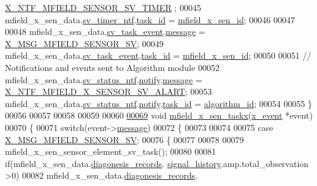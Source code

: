 \begin{DoxyCode}
      \hyperlink{a00025_ad9eede821e7c65d58f1806af4bd6bf29}{X\_NTF\_MFIELD\_SENSOR\_SV\_TIMER} ;
00045     mfield\_x\_sen\_data.\hyperlink{a00025_ada91b200053f2d93e3639dc4ee3415b4}{sv\_timer\_ntf}.\hyperlink{a00036_a21b41e494a28583d4da10f1afb1c5328}{task\_id}                        = 
      \hyperlink{a00052_a19a33e680bf19d1aed76750132ed8b64}{mfield\_x\_sen\_id};
00046 
00047 
00048     mfield\_x\_sen\_data.\hyperlink{a00025_a43c345f39ea3aefbb60ef1ef57fe5d83}{sv\_task\_event}.\hyperlink{a00036_adf9665938515a20c283eea2c978cf80d}{message}                  = 
      \hyperlink{a00025_a510020575747f82c587c5485b8619f78}{X\_MSG\_MFIELD\_SENSOR\_SV};
00049     mfield\_x\_sen\_data.\hyperlink{a00025_a43c345f39ea3aefbb60ef1ef57fe5d83}{sv\_task\_event}.\hyperlink{a00036_a21b41e494a28583d4da10f1afb1c5328}{task\_id}              = 
      \hyperlink{a00052_a19a33e680bf19d1aed76750132ed8b64}{mfield\_x\_sen\_id};
00050 
00051     \textcolor{comment}{// Notifications and events sent to Algorithm module}
00052     mfield\_x\_sen\_data.\hyperlink{a00025_a752b00333ec308e07c6bd41aa9a01e73}{sv\_status\_ntf}.\hyperlink{a00019_a8e6a04c2283f9fd7b8dcbc62faba5847}{notify}.\hyperlink{a00036_adf9665938515a20c283eea2c978cf80d}{message}                     = 
      \hyperlink{a00021_a9d9558fb2155bafac3683d00b2a18b3f}{X\_NTF\_MFIELD\_X\_SENSOR\_SV\_ALART};
00053     mfield\_x\_sen\_data.\hyperlink{a00025_a752b00333ec308e07c6bd41aa9a01e73}{sv\_status\_ntf}.\hyperlink{a00019_a8e6a04c2283f9fd7b8dcbc62faba5847}{notify}.\hyperlink{a00036_a21b41e494a28583d4da10f1afb1c5328}{task\_id}                 = 
      \hyperlink{a00021_aff3e3d622fcd96787628167d3c1856f9}{algorithm\_id};
00054 
00055 \}
00056 
00057 
00058 
00059 
00060 
\hypertarget{a00052_source_l00069}{}\hyperlink{a00052_a72e9235043dc4a8469143a6eb48bf117}{00069} \textcolor{keywordtype}{void} \hyperlink{a00052_a72e9235043dc4a8469143a6eb48bf117}{mfield\_x\_sen\_taskx}(\hyperlink{a00036_de/d37/a00849}{x\_event} *event)
00070 \{
00071     \textcolor{keywordflow}{switch}(event->\hyperlink{a00036_adf9665938515a20c283eea2c978cf80d}{message})
00072     \{
00073 
00074 
00075         \textcolor{keywordflow}{case} \hyperlink{a00025_a510020575747f82c587c5485b8619f78}{X\_MSG\_MFIELD\_SENSOR\_SV}:
00076         \{
00077 
00078 
00079             mfield\_x\_sen\_sensor\_element\_sv\_task();
00080 
00081             \textcolor{keywordflow}{if}(mfield\_x\_sen\_data.\hyperlink{a00025_a2bd79ce84bbd6b7f50d38954f7ae475e}{diagonesis\_records}.
      \hyperlink{a00019_ab7038f4de1f77b52a7f89e9f77c0b846}{signal\_history}.amp.total\_observation >0)
00082                 mfield\_x\_sen\_data.\hyperlink{a00025_a2bd79ce84bbd6b7f50d38954f7ae475e}{diagonesis\_records}.

\end{DoxyCode}

